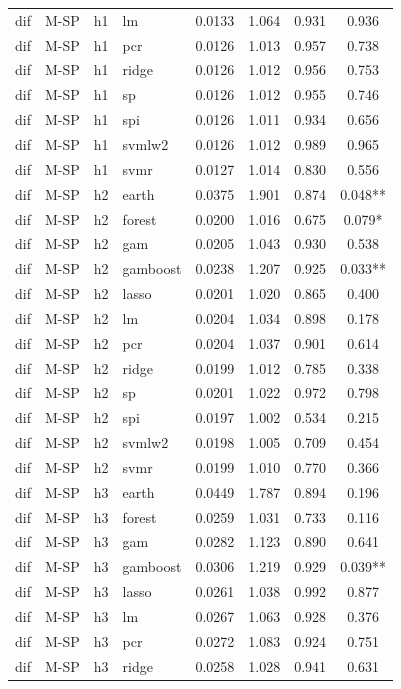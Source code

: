 \begin{ThreePartTable}
\begin{longtable}[t]{llclcccc}
dif & M-SP & h1 & lm & 0.0133 & 1.064 & 0.931 & 0.936\\
dif & M-SP & h1 & pcr & 0.0126 & 1.013 & 0.957 & 0.738\\
dif & M-SP & h1 & ridge & 0.0126 & 1.012 & 0.956 & 0.753\\
dif & M-SP & h1 & sp & 0.0126 & 1.012 & 0.955 & 0.746\\
dif & M-SP & h1 & spi & 0.0126 & 1.011 & 0.934 & 0.656\\
dif & M-SP & h1 & svmlw2 & 0.0126 & 1.012 & 0.989 & 0.965\\
dif & M-SP & h1 & svmr & 0.0127 & 1.014 & 0.830 & 0.556\\
\addlinespace
dif & M-SP & h2 & earth & 0.0375 & 1.901 & 0.874 & 0.048**\\
dif & M-SP & h2 & forest & 0.0200 & 1.016 & 0.675 & 0.079*\\
dif & M-SP & h2 & gam & 0.0205 & 1.043 & 0.930 & 0.538\\
dif & M-SP & h2 & gamboost & 0.0238 & 1.207 & 0.925 & 0.033**\\
dif & M-SP & h2 & lasso & 0.0201 & 1.020 & 0.865 & 0.400\\
dif & M-SP & h2 & lm & 0.0204 & 1.034 & 0.898 & 0.178\\
dif & M-SP & h2 & pcr & 0.0204 & 1.037 & 0.901 & 0.614\\
dif & M-SP & h2 & ridge & 0.0199 & 1.012 & 0.785 & 0.338\\
dif & M-SP & h2 & sp & 0.0201 & 1.022 & 0.972 & 0.798\\
dif & M-SP & h2 & spi & 0.0197 & 1.002 & 0.534 & 0.215\\
dif & M-SP & h2 & svmlw2 & 0.0198 & 1.005 & 0.709 & 0.454\\
dif & M-SP & h2 & svmr & 0.0199 & 1.010 & 0.770 & 0.366\\
\addlinespace
dif & M-SP & h3 & earth & 0.0449 & 1.787 & 0.894 & 0.196\\
dif & M-SP & h3 & forest & 0.0259 & 1.031 & 0.733 & 0.116\\
dif & M-SP & h3 & gam & 0.0282 & 1.123 & 0.890 & 0.641\\
dif & M-SP & h3 & gamboost & 0.0306 & 1.219 & 0.929 & 0.039**\\
dif & M-SP & h3 & lasso & 0.0261 & 1.038 & 0.992 & 0.877\\
dif & M-SP & h3 & lm & 0.0267 & 1.063 & 0.928 & 0.376\\
dif & M-SP & h3 & pcr & 0.0272 & 1.083 & 0.924 & 0.751\\
dif & M-SP & h3 & ridge & 0.0258 & 1.028 & 0.941 & 0.631\\

\end{longtable}
\end{ThreePartTable}
